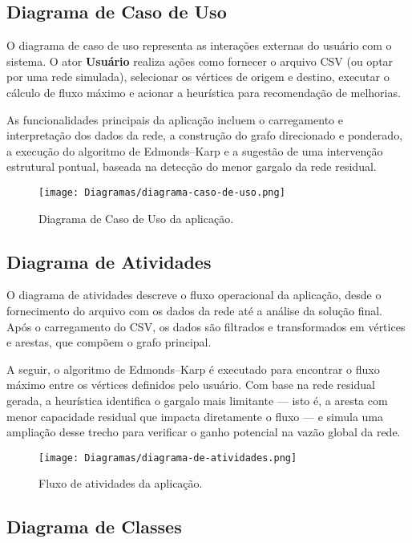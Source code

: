 \documentclass[12pt]{article}
\begin{document}
\subsection{Diagrama de Caso de Uso}

O diagrama de caso de uso representa as interações externas do usuário com o sistema. O ator \textbf{Usuário} realiza ações como fornecer o arquivo CSV (ou optar por uma rede simulada), selecionar os vértices de origem e destino, executar o cálculo de fluxo máximo e acionar a heurística para recomendação de melhorias.

As funcionalidades principais da aplicação incluem o carregamento e interpretação dos dados da rede, a construção do grafo direcionado e ponderado, a execução do algoritmo de Edmonds–Karp e a sugestão de uma intervenção estrutural pontual, baseada na detecção do menor gargalo da rede residual.

\begin{figure}[H]
\centering
\texttt{[image: Diagramas/diagrama-caso-de-uso.png]}
\caption{Diagrama de Caso de Uso da aplicação.}
\label{fig:caso-uso}
\end{figure}

\subsection{Diagrama de Atividades}

O diagrama de atividades descreve o fluxo operacional da aplicação, desde o fornecimento do arquivo com os dados da rede até a análise da solução final. Após o carregamento do CSV, os dados são filtrados e transformados em vértices e arestas, que compõem o grafo principal.

A seguir, o algoritmo de Edmonds–Karp é executado para encontrar o fluxo máximo entre os vértices definidos pelo usuário. Com base na rede residual gerada, a heurística identifica o gargalo mais limitante — isto é, a aresta com menor capacidade residual que impacta diretamente o fluxo — e simula uma ampliação desse trecho para verificar o ganho potencial na vazão global da rede.

\begin{figure}[H] 
\centering
\texttt{[image: Diagramas/diagrama-de-atividades.png]}
\caption{Fluxo de atividades da aplicação.}
\label{fig:atividades}
\end{figure}

\subsection{Diagrama de Classes}
\end{document}
